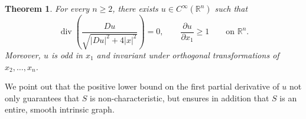 \documentclass[11pt]{amsart}
\renewcommand{\geq}{\geqslant}
\renewcommand{\le}{<}
\renewcommand{\ge}{>}
\newcommand{\rr}{{\mathbb{R}}}
\newcommand{\hh}{{\mathbb{H}}}
\DeclareMathOperator{\divv}{div}
\newtheorem{theorem}{Theorem}[section]
\theoremstyle{definition}
\newtheorem*{subriembp}{Sub-Riemannian stable Bernstein problem}
\theoremstyle{remark}
\numberwithin{equation}{section}
\begin{document}
%
%

\begin{theorem}\label{thm_main_1}
For every $n\geq 2$, there exists $u\in C^\infty(\rr^n)$ such that
\begin{equation}\label{eq:target}
 \divv\left(\frac{Du}{\sqrt{|Du|^2+4|x|^2}}\right)=0,
 \qquad \frac{\partial u}{\partial x_1}\geq 1\qquad\text{on }\rr^n.
\end{equation}
Moreover, $u$ is odd in $x_1$ and invariant under orthogonal transformations of $x_2,\ldots,x_n$.
\end{theorem}

We point out that the positive lower bound on the first partial derivative of $u$ not only guarantees that $S$ is non-characteristic, but ensures in addition that $S$ is an entire, smooth intrinsic graph. 
\end{document}
